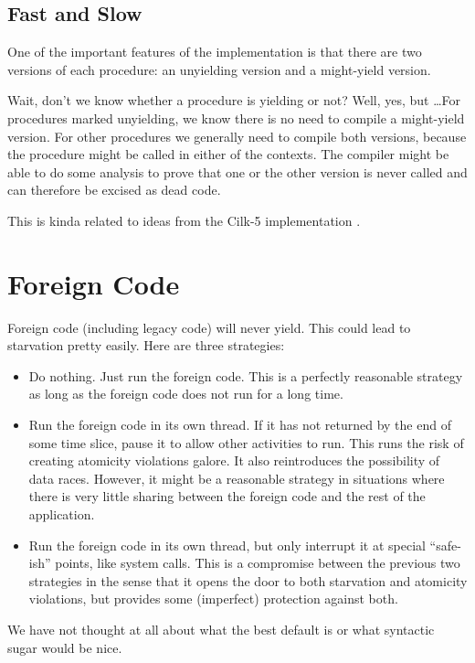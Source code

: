 \documentclass[11pt,preprint]{sigplanconf}
\begin{document}
\subsection{Fast and Slow}

One of the important features of the implementation is that there are
two versions of each procedure: an unyielding version and a might-yield
version.

Wait, don't we know whether a procedure is yielding or not?  Well, yes,
but \ldots For procedures marked unyielding, we know there is no need to
compile a might-yield version.  For other procedures we generally need
to compile both versions, because the procedure might be called in
either of the contexts.  The compiler might be able to do some analysis
to prove that one or the other version is never called and can therefore
be excised as dead code.

This is kinda related to ideas from the Cilk-5 implementation
\cite{Frigo1998}.

\section{Foreign Code}

Foreign code (including legacy code) will never yield.  This could lead
to starvation pretty easily.  Here are three strategies:

\begin{itemize}
\item Do nothing.  Just run the foreign code.  This is a perfectly
  reasonable strategy as long as the foreign code does not run for a
  long time.
\item Run the foreign code in its own thread.  If it has not returned by
  the end of some time slice, pause it to allow other activities to run.
  This runs the risk of creating atomicity violations galore.  It also
  reintroduces the possibility of data races.  However, it might be a
  reasonable strategy in situations where there is very little sharing
  between the foreign code and the rest of the application.
\item Run the foreign code in its own thread, but only interrupt it at
  special ``safe-ish'' points, like system calls.  This is a compromise
  between the previous two strategies in the sense that it opens the
  door to both starvation and atomicity violations, but provides some
  (imperfect) protection against both.
\end{itemize}

We have not thought at all about what the best default is or what
syntactic sugar would be nice.
\end{document}
